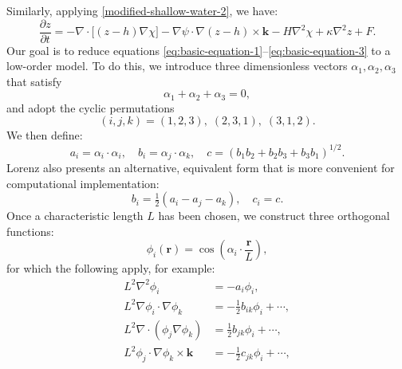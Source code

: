 Similarly, applying \eqref{modified-shallow-water-2}, we have:
\begin{equation}
    \frac{\partial z}{\partial t} 
    = -\nabla \cdot \big[(z - h)\nabla \chi\big]
     
- \nabla \psi \cdot \nabla(z - h) \times \mathbf{k} 
    - H\nabla^2\chi + \kappa\nabla^2z + F.
 
\label{eq:basic-equation-3}
\end{equation}
Our goal is to reduce equations \eqref{eq:basic-equation-1}–\eqref{eq:basic-equation-3} to a low-order model. To do this, we introduce three dimensionless vectors $\alpha_1, \alpha_2, \alpha_3$ that satisfy
\begin{equation*}
    \alpha_1 + \alpha_2 + \alpha_3 = 0,
\end{equation*}
and adopt the cyclic permutations
\begin{equation*}
    (i,j,k) = (1,2,3),\; (2,3,1),\; (3,1,2).
\end{equation*}
We then define:
\begin{equation*}
    a_i = \alpha_i \cdot \alpha_i,
     
\quad b_i = \alpha_j \cdot \alpha_k, 
    \quad c = (b_1b_2+b_2b_3+b_3b_1)^{1/2}.
\end{equation*}
Lorenz also presents an alternative, equivalent form that is more convenient for computational implementation:
\begin{equation*}
    
b_i = \tfrac{1}{2}(a_i - a_j - a_k), 
    \quad c_i = c.
\end{equation*}
Once a characteristic length $L$ has been chosen, we construct three orthogonal functions:
\begin{equation*}
    \phi_i(\mathbf{r}) = \cos\!\left(\alpha_i \cdot \frac{\mathbf{r}}{L}\right),
\end{equation*}
for which the following apply, for example:
\begin{align*}
    
L^2\nabla^2\phi_i                              & = -a_i\phi_i,                         \\
    L^2\nabla\phi_i \cdot \nabla\phi_k             & = -\tfrac{1}{2}b_{ik}\phi_i + \cdots, \\
    L^2\nabla \cdot (\phi_j\nabla\phi_k)           & = \frac{1}{2}b_{jk}\phi_i + \cdots,  \\
    
L^2\phi_j \cdot \nabla\phi_k \times \mathbf{k} & = -\tfrac{1}{2}c_{jk}\phi_i + \cdots, 
\end{align*}
